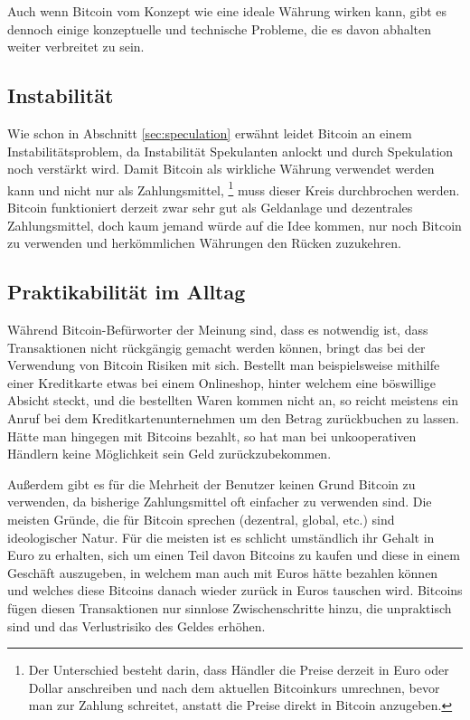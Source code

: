 Auch wenn Bitcoin vom Konzept wie eine ideale Währung wirken kann, gibt es dennoch einige konzeptuelle und technische Probleme, die es davon abhalten weiter verbreitet zu sein.

\subsection{Instabilität}

Wie schon in Abschnitt \ref{sec:speculation} erwähnt leidet Bitcoin an einem Instabilitätsproblem, da Instabilität Spekulanten anlockt und durch Spekulation noch verstärkt wird.
Damit Bitcoin als wirkliche Währung verwendet werden kann und nicht nur als Zahlungsmittel,%
\footnote{Der Unterschied besteht darin, dass Händler die Preise derzeit in Euro oder Dollar anschreiben und nach dem aktuellen Bitcoinkurs umrechnen, bevor man zur Zahlung schreitet, anstatt die Preise direkt in Bitcoin anzugeben.}
muss dieser Kreis durchbrochen werden.
Bitcoin funktioniert derzeit zwar sehr gut als Geldanlage und dezentrales Zahlungsmittel, doch kaum jemand würde auf die Idee kommen, nur noch Bitcoin zu verwenden und herkömmlichen Währungen den Rücken zuzukehren.

\subsection{Praktikabilität im Alltag}

Während Bitcoin-Befürworter der Meinung sind, dass es notwendig ist, dass Transaktionen nicht rückgängig gemacht werden können, bringt das bei der Verwendung von Bitcoin Risiken mit sich.
Bestellt man beispielsweise mithilfe einer Kreditkarte etwas bei einem Onlineshop, hinter welchem eine böswillige Absicht steckt, und die bestellten Waren kommen nicht an, so reicht meistens ein Anruf bei dem Kreditkartenunternehmen um den Betrag zurückbuchen zu lassen.
Hätte man hingegen mit Bitcoins bezahlt, so hat man bei unkooperativen Händlern keine Möglichkeit sein Geld zurückzubekommen.

Außerdem gibt es für die Mehrheit der Benutzer keinen Grund Bitcoin zu verwenden, da bisherige Zahlungsmittel oft einfacher zu verwenden sind.
Die meisten Gründe, die für Bitcoin sprechen (dezentral, global, etc.) sind ideologischer Natur.
Für die meisten ist es schlicht umständlich ihr Gehalt in Euro zu erhalten, sich um einen Teil davon Bitcoins zu kaufen und diese in einem Geschäft auszugeben, in welchem man auch mit Euros hätte bezahlen können und welches diese Bitcoins danach wieder zurück in Euros tauschen wird.
Bitcoins fügen diesen Transaktionen nur sinnlose Zwischenschritte hinzu, die unpraktisch sind und das Verlustrisiko des Geldes erhöhen.

